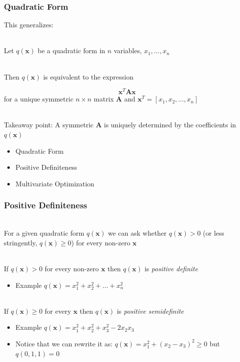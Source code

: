 \documentclass{beamer}
\numberwithin{equation}{section}
\begin{document}
\begin{frame}
\frametitle{Quadratic Form}

This generalizes: \pause

\ \\Let $q(\mathbf{x})$ be a quadratic form in $n$ variables, $x_1, ..., x_n$ \pause

\ \\Then $q(\mathbf{x})$ is equivalent to the expression

$$\mathbf{x}^T\mathbf{A}\mathbf{x}$$ for a unique symmetric $n\times n$ matrix $\mathbf{A}$ and $\mathbf{x}^T=[x_1, x_2, ..., x_n]$ \pause

\ \\Takeaway point: A symmetric $\mathbf{A}$ is uniquely determined by the coefficients in  $q(\mathbf{x})$

\end{frame}



\begin{frame}

\begin{itemize}
\item \textcolor{mygray}{Quadratic Form}
\item \textcolor{myblack}{Positive Definiteness}
\item \textcolor{mygray}{Multivariate Optimization}
\end{itemize}

\end{frame}



\begin{frame}
\frametitle{Positive Definiteness}

\ \\For a given quadratic form $q(\mathbf{x})$ we can ask whether $q(\mathbf{x})>0$ (or less stringently, $q(\mathbf{x})\geq 0$) for every non-zero $\mathbf{x}$ \pause

\ \\If  $q(\mathbf{x})>0$ for every non-zero $\mathbf{x}$ then $q(\mathbf{x})$ is \textit{positive definite} \pause

\begin{itemize}
\item Example $q(\mathbf{x}) = x_1^2+x_2^2+...+x_n^2$
\end{itemize} \pause

\ \\If  $q(\mathbf{x})\geq 0$ for every $\mathbf{x}$ then $q(\mathbf{x})$ is \textit{positive semidefinite} \pause

\begin{itemize}
\item Example $q(\mathbf{x}) = x_1^2+x_2^2+x_3^2-2x_2x_3$ \pause
\item Notice that we can rewrite it as: $q(\mathbf{x}) = x_1^2+(x_2-x_3)^2 \geq 0$ but $q(0, 1, 1)=0$
\end{itemize}

\end{frame}
\end{document}
